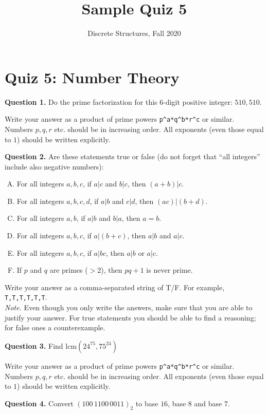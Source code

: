 \documentclass[jou]{apa6}
\title{Sample Quiz 5}
\author{Discrete Structures, Fall 2020}
\affiliation{RBS}
\begin{document}

\twocolumn
\section{Quiz 5: Number Theory}

\vspace{6pt}
{\bf Question 1.} Do the prime factorization for this 6-digit positive integer: 
$510,510$. 

Write your answer as a product of prime powers {\tt p\^{}a*q\^{}b*r\^{}c} or similar. 
Numbers $p,q,r$ etc. should be in increasing order. All exponents (even those equal to $1$) should be written explicitly.


\vspace{6pt}
{\bf Question 2.} Are these statements true or false (do not forget that ``all integers'' include also negative numbers):
\begin{enumerate}[(A)] 
\item For all integers $a,b,c$, if $a|c$ and $b|c$, then $(a + b)|c$.
\item For all integers $a,b,c,d$, if $a|b$ and $c|d$, then $(ac)|(b + d)$.
\item For all integers $a,b$, if $a|b$ and $b|a$, then $a = b$.
\item For all integers $a,b,c$, if $a|(b + c)$, then $a|b$ and $a|c$.
\item For all integers $a,b,c$, if $a|bc$, then $a|b$ or $a|c$.
\item If $p$ and $q$ are primes ($> 2$), then $pq + 1$ is never prime.
\end{enumerate}

Write your answer as a comma-separated string of T/F. For example, {\tt T,T,T,T,T,T}.\\
{\em Note.} Even though you only write the answers, 
make sure that you are able to justify your answer. For true statements you should be able to 
find a reasoning; for false ones \textendash{} a counterexample. 


\vspace{6pt}
{\bf Question 3.} Find $\text{lcm}(24^{75},75^{24})$ 

Write your answer as a product of prime powers {\tt p\^{}a*q\^{}b*r\^{}c} or similar. 
Numbers $p,q,r$ etc. should be in increasing order. All exponents (even those equal to $1$) should be written explicitly.


\vspace{6pt}
{\bf Question 4.}
Convert $(100\,1100\,0011)_2$ to base $16$, base $8$ and base $7$. 
\end{document}
